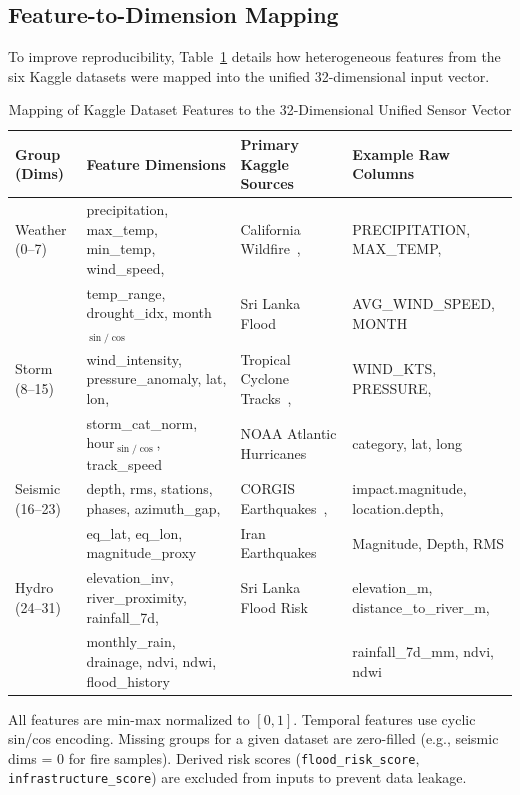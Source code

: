 \documentclass[journal]{IEEEtran}
\begin{document}
\subsection{Feature-to-Dimension Mapping}
\label{sec:feature_mapping}

To improve reproducibility, Table~\ref{tab:feature_mapping} details how heterogeneous features from the six Kaggle datasets were mapped into the unified 32-dimensional input vector.

\begin{table}[!t]
\centering
\caption{Mapping of Kaggle Dataset Features to the 32-Dimensional Unified Sensor Vector}
\label{tab:feature_mapping}
\begin{tabular}{llll}
\toprule
\textbf{Group (Dims)} & \textbf{Feature Dimensions} & \textbf{Primary Kaggle Sources} & \textbf{Example Raw Columns} \\
\midrule
Weather (0--7) & precipitation, max\_temp, min\_temp, wind\_speed, & California Wildfire~\cite{kaggle_fire}, & PRECIPITATION, MAX\_TEMP, \\
 & temp\_range, drought\_idx, month$_{\sin/\cos}$ & Sri Lanka Flood~\cite{kaggle_srilanka_flood} & AVG\_WIND\_SPEED, MONTH \\
\midrule
Storm (8--15) & wind\_intensity, pressure\_anomaly, lat, lon, & Tropical Cyclone Tracks~\cite{kaggle_cyclone_tracks}, & WIND\_KTS, PRESSURE, \\
 & storm\_cat\_norm, hour$_{\sin/\cos}$, track\_speed & NOAA Atlantic Hurricanes~\cite{kaggle_storm_atl} & category, lat, long \\
\midrule
Seismic (16--23) & depth, rms, stations, phases, azimuth\_gap, & CORGIS Earthquakes~\cite{corgis_eq}, & impact.magnitude, location.depth, \\
 & eq\_lat, eq\_lon, magnitude\_proxy & Iran Earthquakes~\cite{kaggle_eq_iran} & Magnitude, Depth, RMS \\
\midrule
Hydro (24--31) & elevation\_inv, river\_proximity, rainfall\_7d, & Sri Lanka Flood Risk~\cite{kaggle_srilanka_flood} & elevation\_m, distance\_to\_river\_m, \\
 & monthly\_rain, drainage, ndvi, ndwi, flood\_history & & rainfall\_7d\_mm, ndvi, ndwi \\
\bottomrule
\end{tabular}
\vspace{2pt}
\raggedright\scriptsize{All features are min-max normalized to $[0, 1]$. Temporal features use cyclic sin/cos encoding. Missing groups for a given dataset are zero-filled (e.g., seismic dims = 0 for fire samples). Derived risk scores (\texttt{flood\_risk\_score}, \texttt{infrastructure\_score}) are excluded from inputs to prevent data leakage.}
\end{table}
\end{document}
